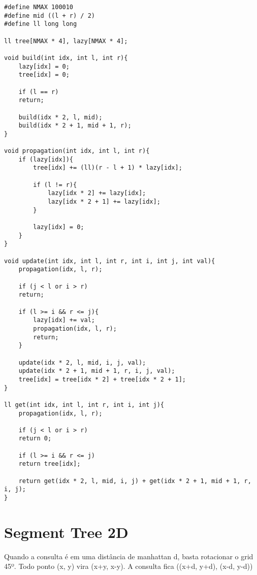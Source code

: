 \begin{multicols}{2}
	\begin{lstlisting}
#define NMAX 100010
#define mid ((l + r) / 2)
#define ll long long

ll tree[NMAX * 4], lazy[NMAX * 4];

void build(int idx, int l, int r){
	lazy[idx] = 0;
	tree[idx] = 0;
	
	if (l == r)
	return;
	
	build(idx * 2, l, mid);
	build(idx * 2 + 1, mid + 1, r);
}

void propagation(int idx, int l, int r){
	if (lazy[idx]){
		tree[idx] += (ll)(r - l + 1) * lazy[idx];
		
		if (l != r){
			lazy[idx * 2] += lazy[idx];
			lazy[idx * 2 + 1] += lazy[idx];
		}
		
		lazy[idx] = 0;
	}
}

void update(int idx, int l, int r, int i, int j, int val){
	propagation(idx, l, r);
	
	if (j < l or i > r)
	return;
	
	if (l >= i && r <= j){	
		lazy[idx] += val;
		propagation(idx, l, r);
		return;
	}
	
	update(idx * 2, l, mid, i, j, val);
	update(idx * 2 + 1, mid + 1, r, i, j, val);
	tree[idx] = tree[idx * 2] + tree[idx * 2 + 1];
}

ll get(int idx, int l, int r, int i, int j){
	propagation(idx, l, r);
	
	if (j < l or i > r)
	return 0;
	
	if (l >= i && r <= j)
	return tree[idx];
	
	return get(idx * 2, l, mid, i, j) + get(idx * 2 + 1, mid + 1, r, i, j);
}

\end{lstlisting}
\end{multicols}

\section{Segment Tree 2D}

Quando a consulta é em uma distância de manhattan d, basta rotacionar o grid 45º.
Todo ponto (x, y) vira (x+y, x-y).
A consulta fica ((x+d, y+d), (x-d, y-d))

